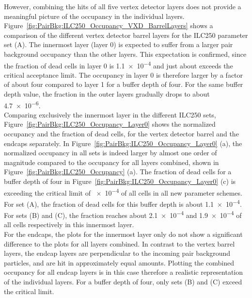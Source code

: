 However, combining the hits of all five vertex detector layers does not provide a meaningful picture of the occupancy in the individual layers.
Figure~\ref{fig:PairBkg:ILC250_Occupancy_VXD_BarrelLayers} shows a comparison of the different vertex detector barrel layers for the ILC250 parameter set (A).
The innermost layer (layer 0) is expected to suffer from a larger pair background occupancy than the other layers.
This expectation is confirmed, since the fraction of dead cells in layer 0 is \num{1.1e-4} and just about exceeds the critical acceptance limit.
The occupancy in layer 0 is therefore larger by a factor of about four compared to layer 1 for a buffer depth of four.
For the same buffer depth value, the fraction in the outer layers gradually drops to about \num{4.7e-6}.
\\Comparing exclusively the innermost layer in the different ILC250 sets, Figure~\ref{fig:PairBkg:ILC250_Occupancy_Layer0} shows the normalized occupancy and the fraction of dead cells, for the vertex detector barrel and the endcaps separately.
In Figure~\ref{fig:PairBkg:ILC250_Occupancy_Layer0} (a), the normalized occupancy in all sets is indeed larger by almost one order of magnitude compared to the occupancy for all layers combined, shown in Figure~\ref{fig:PairBkg:ILC250_Occupancy} (a).
The fraction of dead cells for a buffer depth of four in Figure~\ref{fig:PairBkg:ILC250_Occupancy_Layer0} (c) is exceeding the critical limit of \num{e-4} of all cells in all new parameter schemes.
For set (A), the fraction of dead cells for this buffer depth is about \num{1.1e-4}.
For sets (B) and (C), the fraction reaches about \num{2.1e-4} and \num{1.9e-4} of all cells respectively in this innermost layer.
\\For the endcaps, the plots for the innermost layer only do not show a significant difference to the plots for all layers combined.
In contrast to the vertex barrel layers, the endcap layers are perpendicular to the incoming pair background particles, and are hit in approximately equal amounts.
Plotting the combined occupancy for all endcap layers is in this case therefore a realistic representation of the individual layers.
For a buffer depth of four, only sets (B) and (C) exceed the critical limit.
